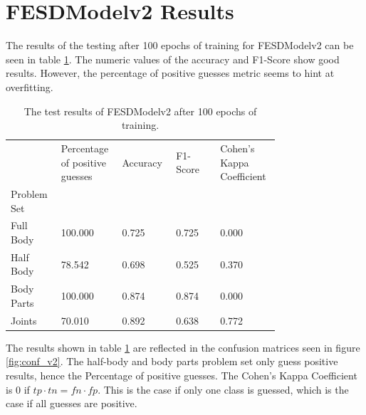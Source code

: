 \section{FESDModelv2 Results}

The results of the testing after 100 epochs of training for FESDModelv2 can be seen in table \ref{tab:res_v2}. The numeric values of the accuracy and F1-Score show good results. However, the percentage of positive guesses metric seems to hint at overfitting.

\begin{table}
  \caption[Test Results of FESDModelv2]{The test results of FESDModelv2 after 100 epochs of training.}
  \label{tab:res_v2}
  \centering
  \begin{tabular}{p{0.15\linewidth}p{0.15\linewidth}p{0.15\linewidth}p{0.15\linewidth}p{0.15\linewidth}}
    \hline
    {} &  Percentage of positive guesses &  Accuracy &  F1-Score &  Cohen's Kappa Coefficient \\
    Problem Set   &                                 &           &           &                            \\
    \hline
    Full Body  &                         100.000 &     0.725 &     0.725 &                      0.000 \\
    Half Body  &                          78.542 &     0.698 &     0.525 &                      0.370 \\
    Body Parts &                         100.000 &     0.874 &     0.874 &                      0.000 \\
    Joints     &                          70.010 &     0.892 &     0.638 &                      0.772 \\
    \hline
  \end{tabular}
\end{table}

The results shown in table \ref{tab:res_v2} are reflected in the confusion matrices seen in figure \ref{fig:conf_v2}. The half-body and body parts problem set only guess positive results, hence the Percentage of positive guesses. The Cohen's Kappa Coefficient is 0 if $tp \cdot tn = fn \cdot fp$. This is the case if only one class is guessed, which is the case if all guesses are positive.

